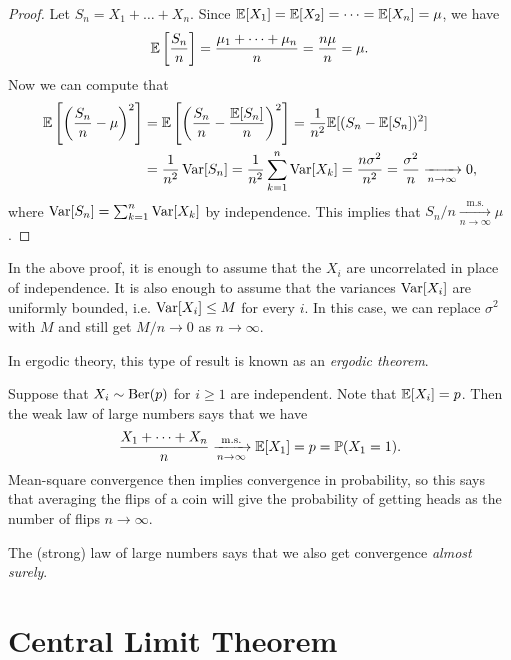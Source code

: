 \begin{proof}
  Let $S_n = X_1 + \dots + X_n$.
  Since $\mathbb{E}[X_1] = \mathbb{E}[X_2] = \dots = \mathbb{E}[X_n] = \mu$,
  we have
  \[
    \mathbb{E}\left[\frac{S_n}{n}\right]
    = \frac{\mu_1 + \dots + \mu_n}{n} = \frac{n\mu}{n}
    = \mu.
  \]
  Now we can compute that
  \begin{align*}
    \mathbb{E}\left[\left(\frac{S_n}{n} - \mu\right)^2\right]
    &= \mathbb{E}\left[\left(\frac{S_n}{n} - \frac{\mathbb{E}[S_n]}{n}\right)^2\right]
    = \frac{1}{n^2} \mathbb{E}[(S_n - \mathbb{E}[S_n])^2] \\
    &= \frac{1}{n^2} \operatorname{Var}[S_n]
    = \frac{1}{n^2} \sum_{k = 1}^n \operatorname{Var}[X_k]
    = \frac{n\sigma^2}{n^2} = \frac{\sigma^2}{n}
    \xrightarrow[n \to \infty]{} 0,
  \end{align*}
  where $\operatorname{Var}[S_n] = \sum_{k = 1}^n \operatorname{Var}[X_k]$ by independence.
  This implies that $S_n / n \xrightarrow[n \to \infty]{\mathrm{m.s.}} \mu$.
\end{proof}

\begin{remark}
  In the above proof, it is enough to assume that the
  $X_i$ are uncorrelated in place of independence.
  It is also enough to assume that the variances
  $\operatorname{Var}[X_i]$ are uniformly bounded, i.e.
  $\operatorname{Var}[X_i] \le M$ for every $i$. In this case,
  we can replace $\sigma^2$ with $M$ and still get
  $M / n \to 0$ as $n \to \infty$.
\end{remark}

\begin{remark}
  In ergodic theory, this type of result is known
  as an \emph{ergodic theorem}.
\end{remark}

\begin{example}
  Suppose that $X_i \sim \operatorname{Ber}(p)$ for $i \ge 1$
  are independent. Note that $\mathbb{E}[X_i] = p$.
  Then the weak law of large numbers says that
  we have
  \[
    \frac{X_1 + \dots + X_n}{n} \xrightarrow[n \to \infty]{\mathrm{m.s.}} \mathbb{E}[X_1] = p = \mathbb{P}(X_1 = 1).
  \]
  Mean-square convergence then implies
  convergence in probability, so
  this says that averaging the flips of a coin
  will give the probability of getting heads
  as the number of flips $n \to \infty$.
\end{example}

\begin{remark}
  The (strong) law of large numbers says that
  we also get convergence \emph{almost surely}.
\end{remark}

\section{Central Limit Theorem}

